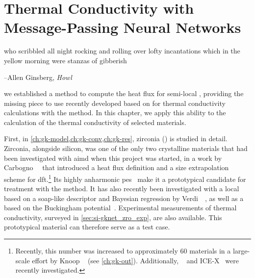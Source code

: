 
\part[Thermal Conductivity with\\ Message-Passing Neural Networks]{Thermal Conductivity with Message-Passing Neural Networks}
\label{part:gka}

\thispagestyle{plain}
\begin{center}
  \begin{minipage}{0.8\textwidth}

    \vspace{4\baselineskip}


    \hangindent=1cm
    \el who scribbled all night rocking and rolling over lofty incantations which in the yellow morning were stanzas of gibberish \el

    \vspace{\baselineskip}
    {\hfill\raggedright --Allen Ginsberg, \textit{Howl}\hspace{0.25cm}}
  \end{minipage}
\end{center}
\vspace{2\baselineskip}

 we established a method to compute the heat flux for semi-local \mlps, providing the missing piece to use recently developed \mlps based on \mpnns for thermal conductivity calculations with the \gk method. In this chapter, we apply this ability to the calculation of the thermal conductivity of selected materials.

First, in \cref{ch:gk-model,ch:gk-conv,ch:gk-res}, zirconia () is studied in detail.
Zirconia, alongside silicon, was one of the only two crystalline materials that had been investigated with \gls{aimd} when this project was started, in a work by Carbogno~\etal{}~\cite{crs2017t} that introduced a heat flux definition and a size extrapolation scheme for \gls{dft}.\footnote{Recently, this number was increased to approximately \num{60} materials in a large-scale effort by Knoop \etal~\cite{kpsc2023t} (see \cref{ch:gk-out}). Additionally, ~\cite{pbg2022t} and ICE-X~\cite{gsb2020t} were recently investigated.} Its highly anharmonic \gls{pes}~\cite{fpf2001t,clws2014t} make it a prototypical candidate for treatment with the \gk method.
It has also recently been investigated with a local \mlp{} based on a \gls{soap}-like descriptor and Bayesian regression by Verdi~\etal{}~\cite{vkjk2021q}, as well as a \ff based on the Buckingham potential~\cite{mbm2020t}. Experimental measurements of thermal conductivity, surveyed in \cref{sec:si-gknet_zro_exp}, are also available.
This prototypical material can therefore serve as a test case.

